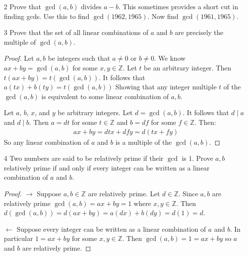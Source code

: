 \begin{problem}{2}
    Prove that $\gcd(a, b)$ divides $a - b$. This sometimes provides a short cut in
    finding gcds. Use this to find $\gcd(1962, 1965)$. Now find $\gcd(1961, 1965)$.
\end{problem}
\unsolved

\begin{problem}{3}
    Prove that the set of all linear combinations of $a$ and $b$
    are precisely the multiple of $\gcd(a, b)$.
\end{problem}
\solved

\begin{proof}
    Let $a, b$ be integers such that $a \not = 0$ or $b \not = 0$.
    We know $ax + by = \gcd(a, b)$ for some $x, y \in \mathbb{Z}$.
    Let $t$ be an arbitrary integer.
    Then $t(ax + by) = t(\gcd(a, b))$.
    It follows that $a(tx) + b(ty) = t(\gcd(a, b))$
    Showing that any integer multiple $t$ of the $\gcd(a, b)$
    is equivalent to some linear combination of $a, b$.

    Let $a$, $b$, $x$, and $y$ be arbitrary integers.
    Let $d = \gcd(a, b)$. It follows that $d \mid a$ and $d \mid b$.
    Then $a = dt$ for some $t \in \mathbb{Z}$ and $b = df$ for some $f \in \mathbb{Z}$.
    Then:
    \begin{align*}
        ax + by = dtx  + dfy = d(tx + fy)
    \end{align*}
    So any linear combination of $a$ and $b$ is a multiple of the $\gcd(a, b)$.
\end{proof}

\begin{problem}{4}
    Two numbers are said to be relatively prime if their $\gcd$ is $1$.
    Prove $a, b$ relatively prime if and only if every integer can be written
    as a linear combination of $a$ and $b$.
\end{problem}
\solved

\begin{proof}
    $\rightarrow$ Suppose $a, b \in \mathbb{Z}$ are relatively prime.
    Let $d \in \mathbb{Z}$. Since $a, b$ are relatively prime $\gcd(a, b) = ax + by = 1$ where $x, y \in \mathbb{Z}$.
    Then $d(\gcd(a, b)) = d(ax + by) = a(dx) + b(dy) = d(1) = d$.

    $\leftarrow$ Suppose every integer can be written as a linear combination of $a$ and $b$.
    In particular $1 = ax + by$ for some $x, y \in \mathbb{Z}$.
    Then $\gcd(a, b) = 1 = ax + by$ so $a$ and $b$ are relatively prime.
\end{proof}

